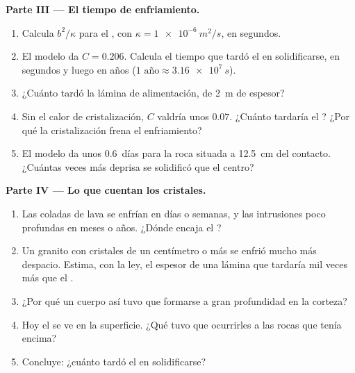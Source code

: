 \begin{problem}
\medskip
\noindent\textbf{Parte III --- El tiempo de enfriamiento.}
\begin{enumerate}[resume]
  \item Calcula $b^2/\kappa$ para el , con $\kappa = \qty{1e-6}{m^2/s}$,
        en segundos.
  \item El modelo da $C = 0.206$. Calcula el tiempo que tardó el  en solidificarse, en
        segundos y luego en años ($\num{1}\text{ año} \approx \qty{3.16e7}{s}$).
  \item ¿Cuánto tardó la lámina de alimentación, de \qty{2}{m} de espesor?
  \item Sin el calor de cristalización, $C$ valdría unos $0.07$.
        ¿Cuánto tardaría el ? ¿Por qué la cristalización frena el
        enfriamiento?
  \item El modelo da unos \num{0.6}~días para la roca situada a \qty{12.5}{cm}
        del contacto. ¿Cuántas veces más deprisa se solidificó que el
        centro?
\end{enumerate}

\medskip
\noindent\textbf{Parte IV --- Lo que cuentan los cristales.}
\begin{enumerate}[resume]
  \item Las coladas de lava se enfrían en días o semanas, y las intrusiones
        poco profundas en meses o años. ¿Dónde encaja el ?
  \item Un granito con cristales de un centímetro o más se enfrió mucho más
        despacio. Estima, con la ley, el espesor de una lámina que tardaría
        mil veces más que el .
  \item ¿Por qué un cuerpo así tuvo que formarse a gran profundidad en la
        corteza?
  \item Hoy el  se ve en la superficie. ¿Qué tuvo que ocurrirles a
        las rocas que tenía encima?
  \item Concluye: ¿cuánto tardó el  en solidificarse?
\end{enumerate}
\end{problem}
